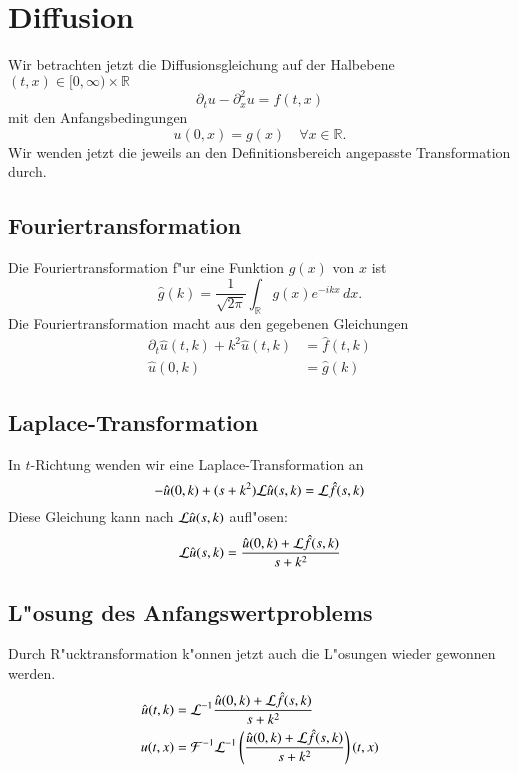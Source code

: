 \section{Diffusion}
Wir betrachten jetzt die Diffusionsgleichung auf der Halbebene
$(t,x)\in[0,\infty)\times \mathbb R$
\[
\partial_tu-\partial_x^2u=f(t,x)
\]
mit den Anfangsbedingungen
\[
u(0,x)=g(x)\quad \forall x\in\mathbb R.
\]
Wir wenden jetzt die jeweils an den Definitionsbereich angepasste
Transformation durch.

\subsection{Fouriertransformation}
Die Fouriertransformation f"ur eine Funktion $g(x)$ von $x$ ist
\[
\hat g(k)=\frac1{\sqrt{2\pi}}\int_{\mathbb R}g(x)e^{-ikx}\,dx.
\]
Die Fouriertransformation macht aus den gegebenen Gleichungen
\begin{align*}
\partial_t \hat u(t,k)+k^2\hat u(t,k)&=\hat f(t,k)\\
\hat u(0,k)&=\hat g(k)
\end{align*}

\subsection{Laplace-Transformation}
In $t$-Richtung wenden wir eine Laplace-Transformation an
\[
-\hat u(0,k)+(s+k^2){\cal L}\hat u(s,k)={\cal L}\hat f(s,k)
\]
Diese Gleichung kann nach ${\cal L}\hat u(s,k)$ aufl"osen:
\[
{\cal L}\hat u(s,k)=\frac{\hat u(0,k)+{\cal L}\hat f(s,k)}{s+k^2}
\]

\subsection{L"osung des Anfangswertproblems}
Durch R"ucktransformation k"onnen jetzt auch die L"osungen wieder
gewonnen werden.
\begin{align*}
\hat u(t,k)&={\cal L}^{-1}
\frac{\hat u(0,k)+{\cal L}\hat f(s,k)}{s+k^2}
\\
u(t,x)&={\cal F}^{-1}{\cal L}^{-1}
\left(\frac{\hat u(0,k)+{\cal L}\hat f(s,k)}{s+k^2}\right)(t,x)
\end{align*}

